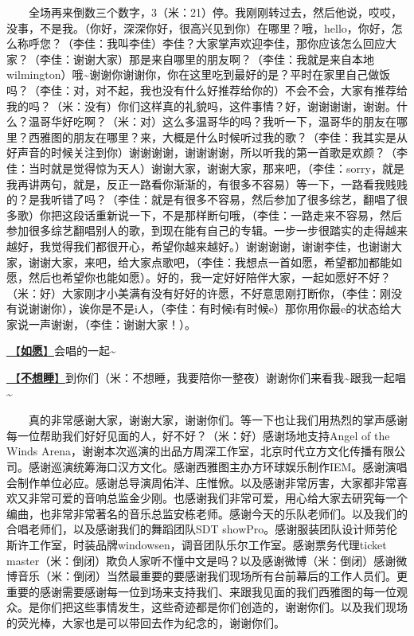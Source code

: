 \documentclass[]{ctexbook}
\begin{document}
  全场再来倒数三个数字，3（米：21）停。我刚刚转过去，然后他说，哎哎，没事，不是我。（你好，深深你好，很高兴见到你）在哪里？哦，hello，你好，怎么称呼您？（李佳：我叫李佳）李佳？大家掌声欢迎李佳，那你应该怎么回应大家？（李佳：谢谢大家）那是来自哪里的朋友啊？（李佳：我就是来自本地wilmington）哦\textasciitilde 谢谢你谢谢你，你在这里吃到最好的是？平时在家里自己做饭吗？（李佳：对，对不起，我也没有什么好推荐给你的）不会不会，大家有推荐给我的吗？（米：没有）你们这样真的礼貌吗，这件事情？好，谢谢谢谢，谢谢。什么？温哥华好吃啊？（米：对）这么多温哥华的吗？我听一下，温哥华的朋友在哪里？西雅图的朋友在哪里？来，大概是什么时候听过我的歌？（李佳：我其实是从好声音的时候关注到你）谢谢谢谢，谢谢谢谢，所以听我的第一首歌是欢颜？（李佳：当时就是觉得惊为天人）谢谢大家，谢谢大家，那来吧，（李佳：sorry，就是我再讲两句，就是，反正一路看你渐渐的，有很多不容易）等一下，一路看我贱贱的？是我听错了吗？（李佳：就是有很多不容易，然后参加了很多综艺，翻唱了很多歌）你把这段话重新说一下，不是那样断句哦，（李佳：一路走来不容易，然后参加很多综艺翻唱别人的歌，到现在能有自己的专辑。一步一步很踏实的走得越来越好，我觉得我们都很开心，希望你越来越好。）谢谢谢谢，谢谢李佳，也谢谢大家，谢谢大家，来吧，给大家点歌吧，（李佳：我想点一首如愿，希望都加都能如愿，然后也希望你也能如愿）。好的，我一定好好陪伴大家，一起如愿好不好？（米：好）大家刚才小美满有没有好好的许愿，不好意思刚打断你，（李佳：刚没有说谢谢你），诶你是不是i人，（李佳：有时候i有时候e）那你用你最e的状态给大家说一声谢谢，（李佳：谢谢大家！）。

\hyperref[As-you-wish]{🎵【\textbf{如愿}】}会唱的一起\textasciitilde{}

\hyperref[donot-want-to-sleep]{🎵【\textbf{不想睡}】}到你们（米：不想睡，我要陪你一整夜）谢谢你们来看我\textasciitilde 跟我一起唱\textasciitilde{}

  真的非常感谢大家，谢谢大家，谢谢你们。等一下也让我们用热烈的掌声感谢每一位帮助我们好好见面的人，好不好？（米：好）感谢场地支持Angel of the Winds Arena，谢谢本次巡演的出品方周深工作室，北京时代立方文化传播有限公司。感谢巡演统筹海口汉方文化。感谢西雅图主办方环球娱乐制作IEM。感谢演唱会制作单位必应。感谢总导演周佑洋、庄惟惞。以及感谢非常厉害，大家都非常喜欢又非常可爱的音响总监金少刚。也感谢我们非常可爱，用心给大家去研究每一个编曲，也非常非常著名的音乐总监安栋老师。感谢今天的乐队老师们。以及我们的合唱老师们，以及感谢我们的舞蹈团队SDT showPro。感谢服装团队设计师劳伦斯许工作室，时装品牌windowsen，调音团队乐尔工作室。感谢票务代理ticket master（米：倒闭）欺负人家听不懂中文是吗？以及感谢微博（米：倒闭）感谢微博音乐（米：倒闭）当然最重要的要感谢我们现场所有台前幕后的工作人员们。更重要的感谢需要感谢每一位到场来支持我们、来跟我见面的我们西雅图的每一位观众。是你们把这些事情发生，这些奇迹都是你们创造的，谢谢你们。以及我们现场的荧光棒，大家也是可以带回去作为纪念的，谢谢你们。
\end{document}
